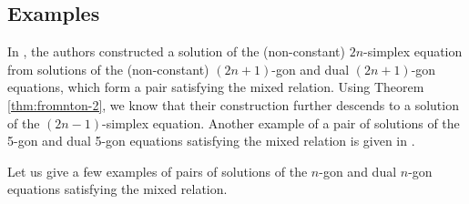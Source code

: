 \documentclass[10pt,a4paper]{amsart}
\numberwithin{equation}{section}
\theoremstyle{definition}
\begin{document}
\subsection{Examples}

In \cite{dimakis2021grassmannian}, the authors constructed a solution of the (non-constant) $2n$-simplex equation from solutions of the (non-constant) $(2n+1)$-gon and dual $(2n+1)$-gon equations, which form a pair satisfying the mixed relation. Using Theorem \ref{thm:fromnton-2}, we know that their construction further descends to a solution of the $(2n-1)$-simplex equation. Another example of a pair of solutions of the 5-gon and dual 5-gon equations satisfying the mixed relation is given in \cite{evripidou2024quadrirational}.

Let us give a few examples of pairs of solutions of the $n$-gon and dual $n$-gon equations satisfying the mixed relation.
\end{document}
